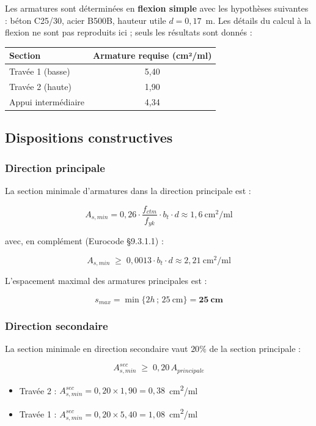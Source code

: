 Les armatures sont déterminées en \textbf{flexion simple} avec les hypothèses suivantes : béton C25/30, acier B500B, hauteur utile $d = 0{,}17$~m. Les détails du calcul à la flexion ne sont pas reproduits ici ; seuls les résultats sont donnés :

\begin{center}
\begin{tabularx}{0.7\linewidth}{Xc}
\toprule
\textbf{Section} & \textbf{Armature requise (cm²/ml)} \\
\midrule
Travée 1 (basse)        & 5{,}40 \\
Travée 2 (haute)        & 1{,}90 \\
Appui intermédiaire     & 4{,}34 \\
\bottomrule
\end{tabularx}
\end{center}

\subsection{Dispositions constructives}

\subsubsection{Direction principale}

La section minimale d'armatures dans la direction principale est :

\[
A_{s,min} = 0{,}26 \cdot \frac{f_{ctm}}{f_{yk}} \cdot b_t \cdot d \approx 1{,}6~\text{cm}^2/\text{ml}
\]

avec, en complément (Eurocode \S{}9.3.1.1) :

\[
A_{s,min} \;\geq\; 0{,}0013 \cdot b_t \cdot d \approx 2{,}21~\text{cm}^2/\text{ml}
\]

L'espacement maximal des armatures principales est :

\[
s_{max} = \min\{2h \,;\, 25~\text{cm}\} = \mathbf{25~\text{cm}}
\]

\subsubsection{Direction secondaire}

La section minimale en direction secondaire vaut $20\%$ de la section principale :

\[
A_{s,min}^{sec} \;\geq\; 0{,}20 \, A_{principale}
\]

\begin{itemize}
  \item Travée 2 : $A_{s,min}^{sec} = 0{,}20 \times 1{,}90 = 0{,}38$~cm\textsuperscript{2}/ml
  \item Travée 1 : $A_{s,min}^{sec} = 0{,}20 \times 5{,}40 = 1{,}08$~cm\textsuperscript{2}/ml
\end{itemize}

